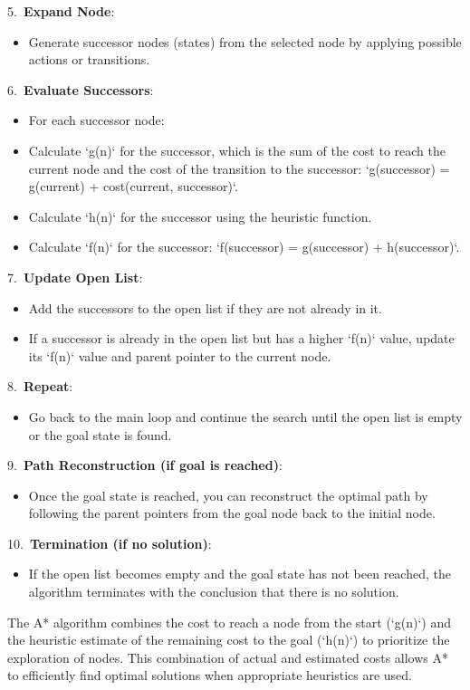 \documentclass{article}
\begin{document}
5.\ \textbf{Expand Node}:
\begin{itemize}
    \item Generate successor nodes (states) from the selected node by applying possible actions or transitions.
\end{itemize}

6.\ \textbf{Evaluate Successors}:
\begin{itemize}
    \item For each successor node:
    \item Calculate `g(n)` for the successor, which is the sum of the cost to reach the current node and the cost of the transition to the successor: `g(successor) = g(current) + cost(current, successor)`.
    \item Calculate `h(n)` for the successor using the heuristic function.
    \item Calculate `f(n)` for the successor: `f(successor) = g(successor) + h(successor)`.
\end{itemize}

7.\ \textbf{Update Open List}:
\begin{itemize}
    \item Add the successors to the open list if they are not already in it.
    \item If a successor is already in the open list but has a higher `f(n)` value, update its `f(n)` value and parent pointer to the current node.
\end{itemize}

8.\ \textbf{Repeat}:
\begin{itemize}
    \item Go back to the main loop and continue the search until the open list is empty or the goal state is found.
\end{itemize}

9.\ \textbf{Path Reconstruction (if goal is reached)}:
\begin{itemize}
    \item Once the goal state is reached, you can reconstruct the optimal path by following the parent pointers from the goal node back to the initial node.
\end{itemize}

10.\ \textbf{Termination (if no solution)}:
\begin{itemize}
    \item If the open list becomes empty and the goal state has not been reached, the algorithm terminates with the conclusion that there is no solution.
\end{itemize}
The A* algorithm combines the cost to reach a node from the start (`g(n)`) and the heuristic estimate of the remaining cost to the goal (`h(n)`) to prioritize the exploration of nodes. This combination of actual and estimated costs allows A* to efficiently find optimal solutions when appropriate heuristics are used.
\end{document}
